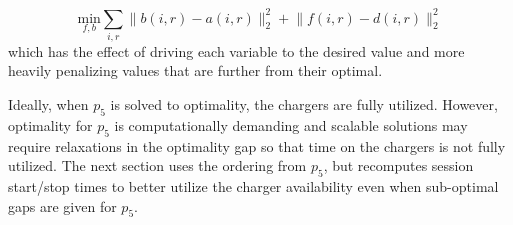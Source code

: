 \begin{equation}\label{eqn:assignment:eqn6}
	\underset{f,b}{\text{min}} \sum_{i,r}\lVert b(i,r) - a(i,r)\rVert_2^2 + \lVert f(i,r) - d(i,r) \rVert_2^2
\end{equation}
which has the effect of driving each variable to the desired value and more heavily penalizing values that are further from their optimal.
\par Ideally, when $p_5$ is solved to optimality, the chargers are fully utilized. However, optimality for $p_5$ is computationally demanding and scalable solutions may require relaxations in the optimality gap so that time on the chargers is not fully utilized. The next section uses the ordering from $p_5$, but recomputes session start/stop times to better utilize the charger availability even when sub-optimal gaps are given for $p_5$.
\\[0.1in]  

